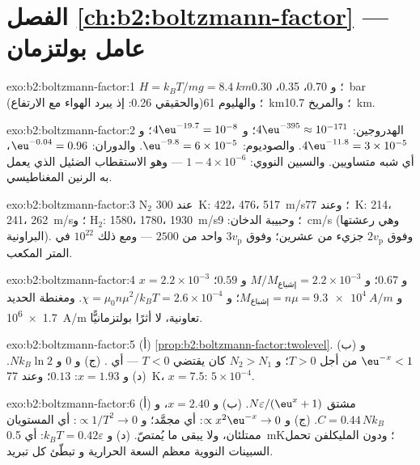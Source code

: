 \section*{الفصل \ref{ch:b2:boltzmann-factor} --- عامل بولتزمان}

\begin{solution}{exo:b2:boltzmann-factor:1}
$H = k_BT/mg = \qty{8.4}{km}$؛ و \qty{0.70}{}، \qty{0.35}{}، \qty{0.30}{bar} (والحقيقي
\qty{0.26}{}: إذ يبرد الهواء مع الارتفاع)؛ والهليوم \qty{61}{km}؛ والمريخ
\qty{10.7}{km}.
\end{solution}

\begin{solution}{exo:b2:boltzmann-factor:2}
الهدروجين: $4\eu^{-395} \approx 10^{-171}$؛ و $4\eu^{-19.7} = 10^{-8}$؛ و $4\eu^{-11.8} = 3 \times
10^{-5}$. والصوديوم: $\eu^{-9.8} = 6 \times 10^{-5}$. والدوران: $\eu^{-0.04} = 0.96$، أي شبه
متساويين. والسبين النووي: $1 - 4 \times 10^{-6}$ --- وهو الاستقطاب الضئيل الذي
يعمل به الرنين المغناطيسي.
\end{solution}

\begin{solution}{exo:b2:boltzmann-factor:3}
N$_2$ عند \qty{300}{K}: \qty{422}{}، \qty{476}{}، \qty{517}{m/s}؛ وعند \qty{77}{K}: \qty{214}{}، \qty{241}{}،
\qty{262}{m/s}؛ و H$_2$: \qty{1580}{}، \qty{1780}{}، \qty{1930}{m/s}؛ وحبيبة الدخان:
\qty{9}{cm/s} (وهي رعشتها البراونية). وفوق $2v_{\text{p}}$ جزيء من
عشرين؛ وفوق $3v_{\text{p}}$ واحد من $2500$ --- ومع ذلك $10^{22}$ في المتر المكعب.
\end{solution}

\begin{solution}{exo:b2:boltzmann-factor:4}
$x = 2.2 \times 10^{-3}$ و $0.67$؛ و $M/M_{\text{إشباع}} = 2.2 \times 10^{-3}$ و $0.59$؛
و $M_{\text{إشباع}} = n\mu = \qty{9.3e4}{A/m}$؛ و $\chi = \mu_0n\mu^2/k_BT = 2.6 \times 10^{-4}$.
ومغنطة الحديد \qty{1.7e6}{A/m} تعاونية، لا أثرًا بولتزمانيًّا.
\end{solution}

\begin{solution}{exo:b2:boltzmann-factor:5}
(أ) \cref{prop:b2:boltzmann-factor:twolevel}. (ب) و $\eu^{-x} < 1$ من أجل $T > 0$؛
و $N_2 > N_1$ كان يقتضي $T < 0$ --- أي . (ج) و $0$ و
$Nk_B\ln 2$. (د) و $x = 1.93$: $0.13$؛ وعند \qty{77}{K}، $x = 7.5$: $5 \times 10^{-4}$.
\end{solution}

\begin{solution}{exo:b2:boltzmann-factor:6}
(أ) مشتق $N\varepsilon/(\eu^x + 1)$. (ب) و $x = 2.40$، و $C = 0.44\,Nk_B$.
(ج) و $\propto x^2\eu^{-x} \to 0$: أي مجمَّد؛ و $\propto 1/T^2 \to 0$: أي المستويان ممتلئان،
ولا يبقى ما يُمتصّ. (د) و $k_BT = 0.42\varepsilon$: أي \qty{0.5}{mK}؛ ودون
المليكلفن تحمل السبينات النووية معظم السعة الحرارية و
تبطّئ كل تبريد.
\end{solution}

